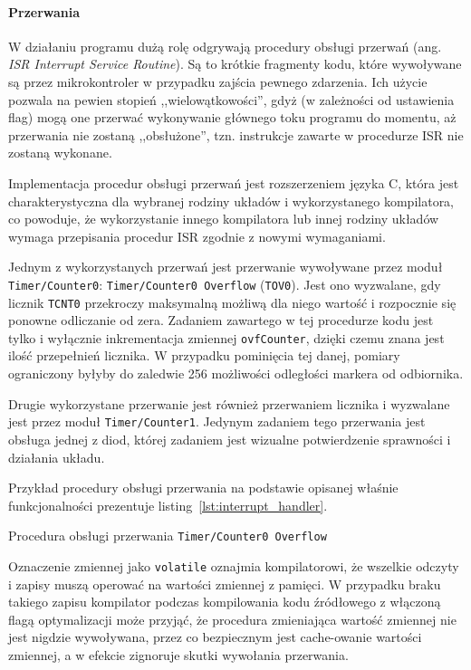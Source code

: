 \paragraph{Przerwania}
W działaniu programu dużą rolę odgrywają procedury obsługi przerwań (ang. \textsl{ISR \ppauza Interrupt Service Routine}). Są to krótkie fragmenty kodu, które wywoływane są przez mikrokontroler w przypadku zajścia pewnego zdarzenia. Ich użycie pozwala na pewien stopień ,,wielowątkowości'', gdyż (w zależności od ustawienia flag) mogą one przerwać wykonywanie głównego toku programu do momentu, aż przerwania nie zostaną ,,obsłużone'', tzn. instrukcje zawarte w procedurze ISR nie zostaną wykonane.

Implementacja procedur obsługi przerwań jest rozszerzeniem języka C, która jest charakterystyczna dla wybranej rodziny układów i wykorzystanego kompilatora, co powoduje, że wykorzystanie innego kompilatora lub innej rodziny układów wymaga przepisania procedur ISR zgodnie z nowymi wymaganiami.

Jednym z wykorzystanych przerwań jest przerwanie wywoływane przez moduł \texttt{Timer/Counter0}: \texttt{Timer/Counter0 Overflow} (\texttt{TOV0}). Jest ono wyzwalane, gdy licznik \texttt{TCNT0} przekroczy maksymalną możliwą dla niego wartość i rozpocznie się ponowne odliczanie od zera. Zadaniem zawartego w tej procedurze kodu jest tylko i wyłącznie inkrementacja zmiennej \texttt{ovfCounter}, dzięki czemu znana jest ilość przepełnień licznika. W przypadku pominięcia tej danej, pomiary ograniczony byłyby do zaledwie 256 możliwości odległości markera od odbiornika.

Drugie wykorzystane przerwanie jest również przerwaniem licznika i wyzwalane jest przez moduł \texttt{Timer/Counter1}. Jedynym zadaniem tego przerwania jest obsługa jednej z diod, której zadaniem jest wizualne potwierdzenie sprawności i działania układu.

Przykład procedury obsługi przerwania na podstawie opisanej właśnie funkcjonalności prezentuje listing~\ref{lst:interrupt_handler}.

\begin{listing}
  
  \caption{Procedura obsługi przerwania \texttt{Timer/Counter0 Overflow}}
  \label{lst:interrupt_handler}
\end{listing}

Oznaczenie zmiennej jako \texttt{volatile} oznajmia kompilatorowi, że wszelkie odczyty i zapisy muszą operować na wartości zmiennej z pamięci. W przypadku braku takiego zapisu kompilator podczas kompilowania kodu źródłowego z włączoną flagą optymalizacji może przyjąć, że procedura zmieniająca wartość zmiennej nie jest nigdzie wywoływana, przez co bezpiecznym jest cache-owanie wartości zmiennej, a w efekcie zignoruje skutki wywołania przerwania.


